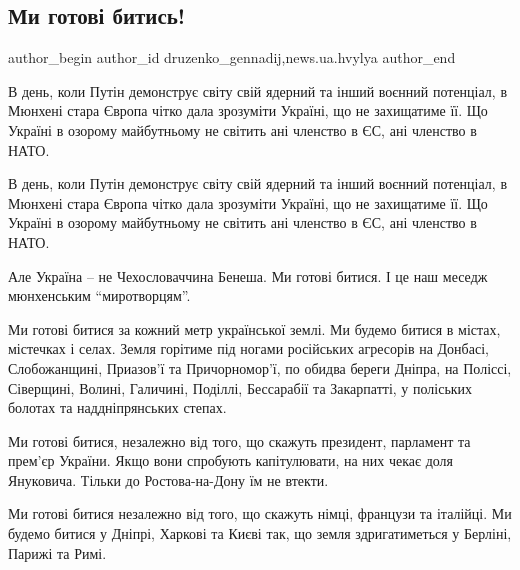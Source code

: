  
 
 
 
 
 
\subsection{Ми готові битись!}
\label{sec:20_02_2022.stz.news.ua.hvylya.1.my_gotovi_bytys}
 
\ifcmt
 author_begin
   author_id druzenko_gennadij,news.ua.hvylya
 author_end
\fi

\begin{zznagolos}
В день, коли Путін демонструє світу свій ядерний та інший воєнний потенціал, в
Мюнхені стара Європа чітко дала зрозуміти Україні, що не захищатиме її. Що
Україні в озорому майбутньому не світить ані членство в ЄС, ані членство в
НАТО.
\end{zznagolos}


В день, коли Путін демонструє світу свій ядерний та інший воєнний потенціал, в
Мюнхені стара Європа чітко дала зрозуміти Україні, що не захищатиме її. Що
Україні в озорому майбутньому не світить ані членство в ЄС, ані членство в
НАТО.

Але Україна – не Чехословаччина Бенеша. Ми готові битися. І це наш меседж
мюнхенським \enquote{миротворцям}.

Ми готові битися за кожний метр української землі. Ми будемо битися в містах,
містечках і селах. Земля горітиме під ногами російських агресорів на Донбасі,
Слобожанщині, Приазов’ї та Причорномор’ї, по обидва береги Дніпра, на Поліссі,
Сіверщині, Волині, Галичині, Поділлі, Бессарабії та Закарпатті, у поліських
болотах та наддніпрянських степах.

Ми готові битися, незалежно від того, що скажуть президент, парламент та
прем’єр України. Якщо вони спробують капітулювати, на них чекає доля Януковича.
Тільки до Ростова-на-Дону їм не втекти.

Ми готові битися незалежно від того, що скажуть німці, французи та італійці. Ми
будемо битися у Дніпрі, Харкові та Києві так, що земля здригатиметься у
Берліні, Парижі та Римі.

